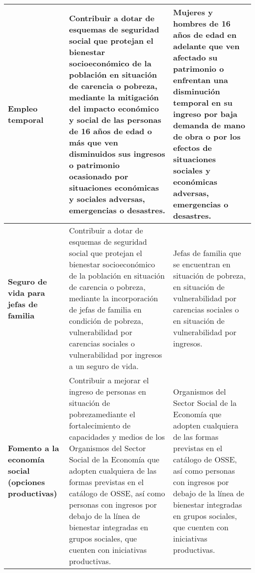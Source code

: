 \begin{longtable}{|p{4cm}|p{6cm}|p{6cm}|}
    \hline
    \textbf{Empleo temporal} & Contribuir   a   dotar   de   esquemas   de seguridad social     que     protejan el bienestar socioeconómico de la población   en  situación  de   carencia   o pobreza,   mediante   la   mitigación   del impacto   económico   y   social   de   las personas de 16 años de edad o más que ven disminuidos sus ingresos o patrimonio  ocasionado  por situaciones económicas y sociales adversas, emergencias o desastres. & Mujeres y hombres de 16 años de edad en   adelante   que   ven   afectado   su patrimonio o enfrentan una disminución  temporal  en  su  ingreso por baja demanda de mano de obra o por los efectos de situaciones sociales y económicas adversas, emergencias o desastres. \\
    \hline
    \textbf{Seguro de vida para jefas de familia} & Contribuir   a   dotar   de   esquemas   de seguridad     social     que     protejan el bienestar socioeconómico de la población   en  situación  de   carencia   o pobreza,  mediante  la  incorporación  de jefas de familia en condición de pobreza, vulnerabilidad  por  carencias  sociales  o vulnerabilidad por ingresos a un seguro de vida. & Jefas  de  familia  que  se  encuentran  en situación  de  pobreza,  en  situación  de vulnerabilidad  por  carencias  sociales o  en  situación  de  vulnerabilidad  por ingresos. \\
    \hline
    \textbf{Fomento a la economía social (opciones productivas)} & Contribuir   a   mejorar el ingreso de personas en situación de pobrezamediante el fortalecimiento de capacidades y medios de los Organismos del Sector Social de la Economía que adopten cualquiera de las formas previstas en el catálogo de OSSE, así como personas con ingresos por debajo de la  línea de bienestar integradas en grupos     sociales,     que     cuenten     con iniciativas productivas. & Organismos   del   Sector   Social   de   la Economía  que  adopten  cualquiera  de las formas previstas en el catálogo de OSSE, así como personas con ingresos por debajo de la línea de bienestar integradas en grupos sociales, que cuenten con iniciativas productivas. \\
    \hline
\end{longtable}
\label{tab:programas}

